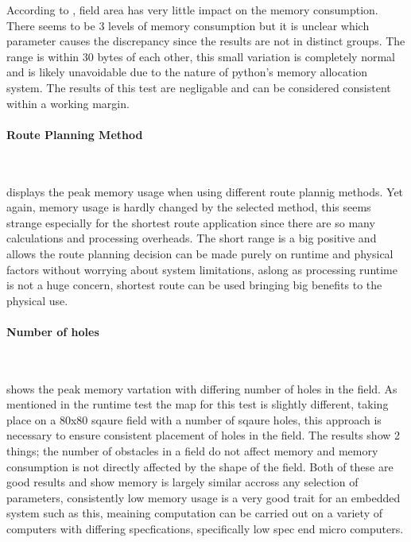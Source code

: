 \documentclass[final]{cmpreport_02}
\begin{document}
According to , field area has very little impact on the memory consumption.
There seems to be 3 levels of memory consumption but it is unclear which parameter causes the discrepancy since the results are not in distinct groups.
The range is within 30 bytes of each other, this small variation is completely normal and is likely unavoidable due to the nature of python's memory allocation system.
The results of this test are negligable and can be considered consistent within a working margin.



\paragraph{Route Planning Method} \

 displays the peak memory usage when using different route plannig methods. Yet again, memory usage is hardly changed by the selected method, this seems strange especially for the shortest route application since there are so many calculations and processing overheads.
The short range is a big positive and allows the route planning decision can be made purely on runtime and physical factors without worrying about system limitations, aslong as processing runtime is not a huge concern, shortest route can be used bringing big benefits to the physical use.



\paragraph{Number of holes} \

 shows the peak memory vartation with differing number of holes in the field.
As mentioned in the runtime test the map for this test is slightly different, taking place on a 80x80 sqaure field with a number of sqaure holes, this approach is necessary to ensure consistent placement of holes in the field.
The results show 2 things; the number of obstacles in a field do not affect memory and memory consumption is not directly affected by the shape of the field.
Both of these are good results and show memory is largely similar accross any selection of parameters, consistently low memory usage is a very good trait for an embedded system such as this, meaining computation can be carried out on a variety of computers with differing specfications, specifically low spec end micro computers.
\end{document}
